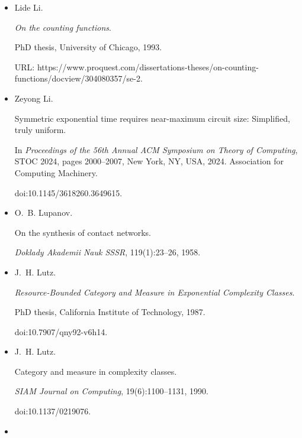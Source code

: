 \begin{itemize}
\item[] 
[45]

Lide Li.


\emph{On the counting functions}.


PhD thesis, University of Chicago, 1993.


URL:
https://www.proquest.com/dissertations-theses/on-counting-functions/docview/304080357/se-2.





\item[] 
[46]

Zeyong Li.


Symmetric exponential time requires near-maximum circuit size:
Simplified, truly uniform.


In \emph{Proceedings of the 56th Annual ACM Symposium on Theory of
Computing}, STOC 2024, pages 2000–2007, New York, NY, USA, 2024. Association
for Computing Machinery.


doi:10.1145/3618260.3649615.





\item[] 
[47]

O. B. Lupanov.


On the synthesis of contact networks.


\emph{Doklady Akademii Nauk SSSR}, 119(1):23–26, 1958.





\item[] 
[48]

J. H. Lutz.


\emph{Resource-Bounded Category and Measure in Exponential Complexity
Classes}.


PhD thesis, California Institute of Technology, 1987.


doi:10.7907/qny92-v6h14.





\item[] 
[49]

J. H. Lutz.


Category and measure in complexity classes.


\emph{SIAM Journal on Computing}, 19(6):1100–1131, 1990.


doi:10.1137/0219076.





\item[] 
[50]


\end{itemize}

